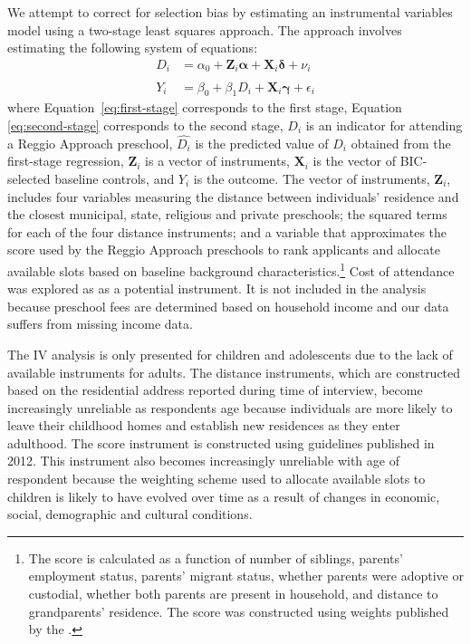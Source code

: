We attempt to correct for selection bias by estimating an instrumental variables model using a two-stage least squares approach. The approach involves estimating the following system of equations:
\begin{align}
D_i &= \alpha_0 + \bm{Z}_i \bm{\alpha} + \bm{X}_i \bm{\delta} + \nu_i \label{eq:first-stage}\\
Y_i &= \beta_0 + \beta_1 \hat{D_i} + \bm{X}_i \bm{\gamma} + \epsilon_i \label{eq:second-stage}
\end{align}
where Equation~\eqref{eq:first-stage} corresponds to the first stage, Equation \eqref{eq:second-stage} corresponds to the second stage, $D_i$ is an indicator for attending a Reggio Approach preschool, $\hat{D_i}$ is the predicted value of $D_i$ obtained from the first-stage regression, $\bm{Z}_i$ is a vector of instruments, $\bm{X}_i$ is the vector of BIC-selected baseline controls, and $Y_i$ is the outcome. The vector of instruments, $\bm{Z}_i$, includes four variables measuring the distance between individuals' residence and the closest municipal, state, religious and private preschools; the squared terms for each of the four distance instruments; and a variable that approximates the score used by the Reggio Approach preschools to rank applicants and allocate available slots based on baseline background characteristics.\footnote{The score is calculated as a function of number of siblings, parents' employment status, parents' migrant status, whether parents were adoptive or custodial, whether both parents are present in household, and distance to grandparents' residence. The score was constructed using weights published by the \citet{Reggio-Emilia_2012_Criteria-admission-2013-14}.} Cost of attendance was explored as as a potential instrument. It is not included in the analysis because preschool fees are determined based on household income and our data suffers from missing income data.

The IV analysis is only presented for children and adolescents due to the lack of available instruments for adults. The distance instruments, which are constructed based on the residential address reported during time of interview, become increasingly unreliable as respondents age because individuals are more likely to leave their childhood homes and establish new residences as they enter adulthood. The score instrument is constructed using guidelines published in 2012. This instrument also becomes increasingly unreliable with age of respondent because the weighting scheme used to allocate available slots to children is likely to have evolved over time as a result of changes in economic, social, demographic and cultural conditions.

